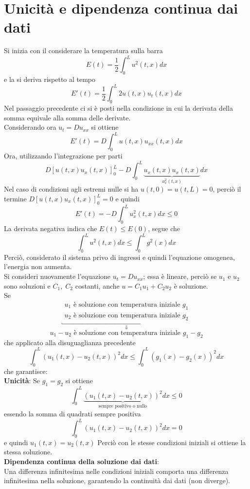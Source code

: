 \section{Unicit\`a e dipendenza continua dai dati}
Si inizia con il considerare la temperatura sulla barra
\[
	E(t)= \frac{1}{2}\int_0^L u^2 (t,x) dx
\]
e la si deriva rispetto al tempo
\[
	E'(t)= \frac{1}{2}\int_0^L 2u(t,x)u_t(t,x)dx
\]
Nel passaggio precedente ci si \`e posti nella condizione in cui la derivata della somma equivale alla somma delle derivate.\\
Considerando ora $u_t=Du_{xx}$ si ottiene
\[
	E'(t)= D\int_0^L u(t,x)u_{xx}(t,x)dx
\]
Ora, utilizzando l'integrazione per parti
\[
	D\left[u(t,x)u_x(t,x)\right]_0^L - D\int_0^L 
	\underbrace{u_x(t,x)u_x(t,x)}_{u_x^2(t,x)}dx
\]
Nel caso di condizioni agli estremi nulle si ha $u(t,0)=u(t,L)=0$, perci\`o il termine $D\left[u(t,x)u_x(t,x)\right]_0^L=0$ e quindi
\[
	E'(t)= - D \int_0^L u_x^2(t,x) dx \leq 0
\]
La derivata negativa indica che $E(t)\leq E(0)$, segue che
\[
	\int_0^L u^2(t,x)dx \leq \int_0^L g^2 (x) dx
\]
Perci\`o, considerato il sistema privo di ingressi e quindi l'equazione
omogenea, l'energia non aumenta.\\
Si consideri nuovamente l'equazione $u_t=Du_{xx}$; essa \`e lineare, perci\`o
se $u_1$ e $u_2$ sono soluzioni e $C_1,\; C_2$ costanti, anche $u=C_1u_1+C_2u_2$ \`e soluzione.\\
Se
\[
	\underbracket{
		\begin{array}{l}
			u_1 \text{ \`e soluzione con temperatura iniziale } g_1 \\
			u_2 \text{ \`e soluzione con temperatura iniziale } g_2
		\end{array}
		}_{\Downarrow}
\]
\[
	u_1-u_2 \text{ \`e soluzione con temperatura iniziale } g_1-g_2
\]
che applicato alla disuguaglianza precedente
\[
	\int_0^L \left(u_1(t,x)-u_2(t,x)\right)^2 dx
	\leq
	\int_0^L \left(g_1(x)-g_2(x)\right)^2 dx
\]
che garantisce:\\
{\bf Unicit\`a}: Se $g_1=g_2$ si ottiene
\[
	\int_0^L \underbrace{\left(u_1(t,x)-u_2(t,x)\right)^2}_\text{sempre positivo o nullo} dx
	\leq 0
\]
essendo la somma di quadrati sempre positiva
\[
	\int_0^L \left(u_1(t,x)-u_2(t,x)\right)^2 dx
	= 0
\]
e quindi $u_1(t,x)=u_2(t,x)$
Perci\`o con le stesse condizioni iniziali si ottiene la stessa soluzione.\\
{\bf Dipendenza continua della soluzione dai dati}:\\
Una differenza infinitesima nelle condizioni iniziali comporta una differenza
infinitesima nella soluzione, garantendo la continuit\`a dai dati (non diverge).

